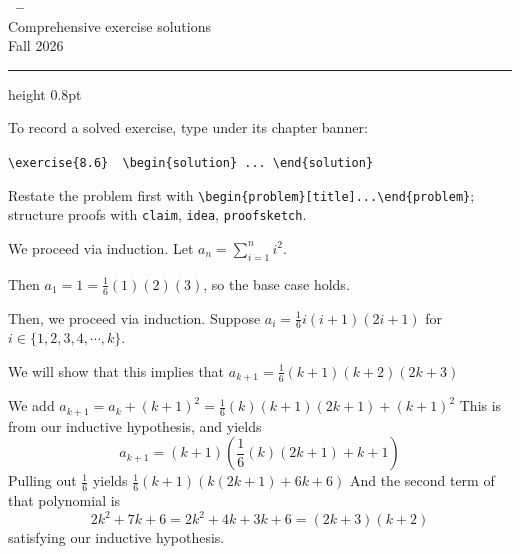 \pagestyle{fancy}
\fancyhf{}
\fancyhead[L]{\coursename}
\fancyhead[R]{\studentname}
\fancyfoot[C]{\thepage}



\begin{center}
  {\Large\sffamily\bfseries\color{navy}\coursename\ -- \courselongname}\\[3pt]
  {\sffamily\color{muted} Comprehensive exercise solutions}\\[3pt]
  {\small\sffamily\color{muted}\textbookname\quad\textbullet\quad Fall 2026\quad\textbullet\quad \studentname}
\end{center}
\medskip
{\color{rule}\hrule height 0.8pt}
\bigskip

{\small
\begin{tcolorbox}[colback=paperblue, colframe=rule, boxrule=0.4pt, arc=2pt,
  left=7pt, right=7pt, top=5pt, bottom=5pt,
  title={\sffamily\bfseries\color{navy} Adding a solution},
  colbacktitle=paperblue]
\sffamily To record a solved exercise, type under its chapter banner:
\begin{center}
\texttt{\textbackslash exercise\{8.6\}\ \ \textbackslash begin\{solution\}\ ...\ \textbackslash end\{solution\}}
\end{center}
Restate the problem first with \texttt{\textbackslash begin\{problem\}[title]...\textbackslash end\{problem\}};
structure proofs with \texttt{claim}, \texttt{idea}, \texttt{proofsketch}.
\end{tcolorbox}
}

\medskip
\tableofcontents

\begin{example}[1.1]
We proceed via induction.
Let $a_n = \sum_{i=1}^{n} i^2$.\par  Then $a_1 = 1 = \frac{1}{6}(1)(2)(3)$, so the base case
    holds.
    \par Then, we proceed via induction. Suppose $a_i = \frac{1}{6}i(i + 1) (2i + 1)$
    for $i \in \{1, 2, 3, 4, \cdots, k\}.$ 
    \par We will show that this implies that $a_{k +
    1} = \frac{1}{6}(k + 1)(k + 2)(2k + 3)$
    \par We add $a_{k + 1} = a_{k} + (k + 1)^2 = \frac{1}{6} (k)(k+1)(2k+1) + (k+1)^2$
    This is from our inductive hypothesis, and yields $$a_{k+1} = (k +
    1)\left(\frac{1}{6}(k)(2k + 1) + k + 1\right)$$
    Pulling out $\frac{1}{6}$ yields $\frac{1}{6}(k + 1)(k(2k + 1) + 6k + 6)$
    And the second term of that polynomial is $$2k^2 + 7k + 6 = 2k^2 + 4k + 3k + 6 = (2k
    +3)(k + 2)$$
    satisfying our inductive hypothesis.
\end{example}

